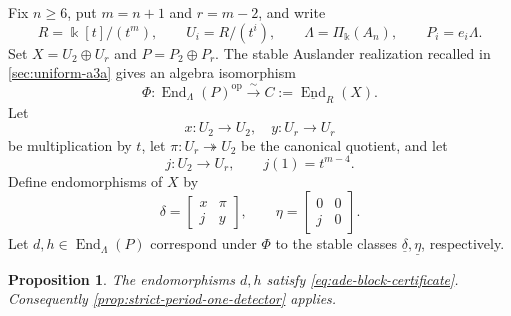 \documentclass[a4paper,11pt,reqno]{amsart}
\newtheorem{proposition}[proposition]{Proposition}
\theoremstyle{definition}
\theoremstyle{plain}
\numberwithin{equation}{section}
\newcommand{\End}{\operatorname{End}}
\newcommand{\kk}{\Bbbk}
\begin{document}
Fix \(n\ge6\), put \(m=n+1\) and \(r=m-2\), and write
\[
 R=\kk[t]/(t^m),
 \qquad U_i=R/(t^i),
 \qquad \Lambda=\Pi_\kk(A_n),
 \qquad P_i=e_i\Lambda.
\]
Set \(X=U_2\oplus U_r\) and \(P=P_2\oplus P_r\).  The stable Auslander realization recalled in
\cref{sec:uniform-a3a}
\cite[Section~7, pp.~219--220]{DlabRingel1992} gives an algebra
isomorphism
\begin{equation}
\label{eq:an-corner-anti-isomorphism}
 \Phi:\End_\Lambda(P)^{\mathrm{op}}
 \xrightarrow{\sim}
 C:=\underline{\End}_R(X).
\end{equation}
Let
\[
 x:U_2\to U_2,
 \quad y:U_r\to U_r
\]
be multiplication by \(t\), let \(\pi:U_r\twoheadrightarrow U_2\) be the
canonical quotient, and let
\[
 j:U_2\longrightarrow U_r,
 \qquad j(1)=t^{m-4}.
\]
Define endomorphisms of \(X\) by
\begin{equation}
\label{eq:an-delta-eta}
 \delta=\begin{bmatrix}x&\pi\\ j&y\end{bmatrix},
 \qquad
 \eta=\begin{bmatrix}0&0\\ j&0\end{bmatrix}.
\end{equation}
Let \(d,h\in\End_\Lambda(P)\) correspond under \(\Phi\) to
the stable classes \(\underline\delta,\underline\eta\), respectively.

\begin{proposition}
\label{prop:an-period-one}
The endomorphisms \(d,h\) satisfy \eqref{eq:ade-block-certificate}.
Consequently \cref{prop:strict-period-one-detector} applies.
\end{proposition}
\end{document}
